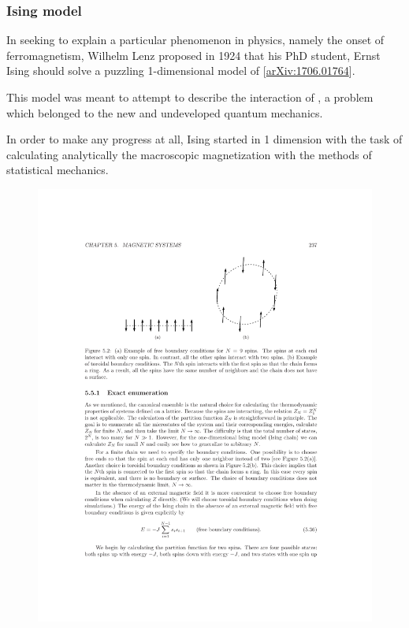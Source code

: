 \documentclass[hyperref={colorlinks=true}]{beamer}
\begin{document}
\begin{frame}%
  \frametitle{Ising model}
  
  
  In seeking to explain a particular phenomenon in physics, namely the onset of ferromagnetism, Wilhelm Lenz proposed in 1924 that his PhD student, Ernst Ising should solve a puzzling 1-dimensional model of  [\href{https://arxiv.org/abs/1706.01764}{arXiv:1706.01764}]. 
  
  \vspace{0.3cm}
  
  This model was meant to attempt to describe the interaction of , a problem which belonged to the new and undeveloped quantum mechanics. 
  
  \vspace{0.3cm}
  
  In order to make any progress at all, Ising started in 1 dimension with the task of calculating analytically the macroscopic magnetization with the methods of statistical mechanics.
  
  \begin{figure}
    \centering
    \includegraphics[width=\textwidth]{Ising-spins-1D.pdf}
  \end{figure}
  

\end{frame}
\end{document}
